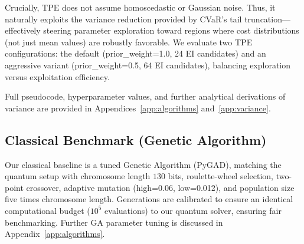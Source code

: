 Crucially, TPE does not assume homoscedastic or Gaussian noise. Thus, it naturally exploits the variance reduction provided by CVaR's tail truncation—effectively steering parameter exploration toward regions where cost distributions (not just mean values) are robustly favorable. We evaluate two TPE configurations: the default (prior\_weight=1.0, 24 EI candidates) and an aggressive variant (prior\_weight=0.5, 64 EI candidates), balancing exploration versus exploitation efficiency.

Full pseudocode, hyperparameter values, and further analytical derivations of variance are provided in Appendices~\ref{app:algorithms} and~\ref{app:variance}.


\subsection{Classical Benchmark (Genetic Algorithm)}

Our classical baseline is a tuned Genetic Algorithm (PyGAD), matching the quantum setup with chromosome length \(130\) bits, roulette-wheel selection, two-point crossover, adaptive mutation (high=0.06, low=0.012), and population size five times chromosome length. Generations are calibrated to ensure an identical computational budget (\(10^5\) evaluations) to our quantum solver, ensuring fair benchmarking. Further GA parameter tuning is discussed in Appendix~\ref{app:algorithms}.
